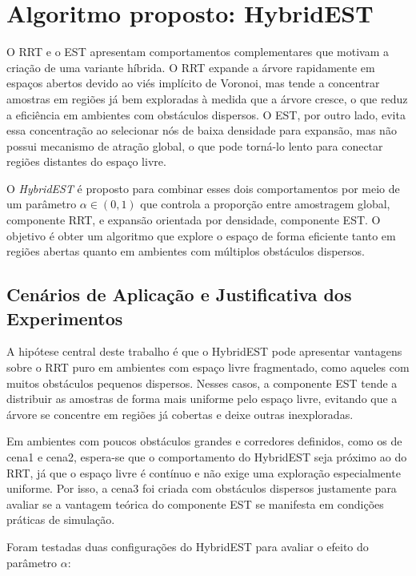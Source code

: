 \iffalse

\section{Algoritmo proposto: HybridEST}
\label{sec:hybridest_proposto}

O RRT e o EST apresentam comportamentos complementares que motivam a criação de uma variante híbrida. O RRT expande a árvore rapidamente em espaços abertos devido ao viés implícito de Voronoi, mas tende a concentrar amostras em regiões já bem exploradas à medida que a árvore cresce, o que reduz a eficiência em ambientes com obstáculos dispersos. O EST, por outro lado, evita essa concentração ao selecionar nós de baixa densidade para expansão, mas não possui mecanismo de atração global, o que pode torná-lo lento para conectar regiões distantes do espaço livre.

O \emph{HybridEST} é proposto para combinar esses dois comportamentos por meio de um parâmetro $\alpha \in (0, 1)$ que controla a proporção entre amostragem global, componente RRT, e expansão orientada por densidade, componente EST. O objetivo é obter um algoritmo que explore o espaço de forma eficiente tanto em regiões abertas quanto em ambientes com múltiplos obstáculos dispersos.

\subsection{Cenários de Aplicação e Justificativa dos Experimentos}
\label{subsec:cenarios_hybridest}

A hipótese central deste trabalho é que o HybridEST pode apresentar vantagens sobre o RRT puro em ambientes com espaço livre fragmentado, como aqueles com muitos obstáculos pequenos dispersos. Nesses casos, a componente EST tende a distribuir as amostras de forma mais uniforme pelo espaço livre, evitando que a árvore se concentre em regiões já cobertas e deixe outras inexploradas.

Em ambientes com poucos obstáculos grandes e corredores definidos, como os de cena1 e cena2, espera-se que o comportamento do HybridEST seja próximo ao do RRT, já que o espaço livre é contínuo e não exige uma exploração especialmente uniforme. Por isso, a cena3 foi criada com obstáculos dispersos justamente para avaliar se a vantagem teórica do componente EST se manifesta em condições práticas de simulação.

Foram testadas duas configurações do HybridEST para avaliar o efeito do parâmetro $\alpha$:

